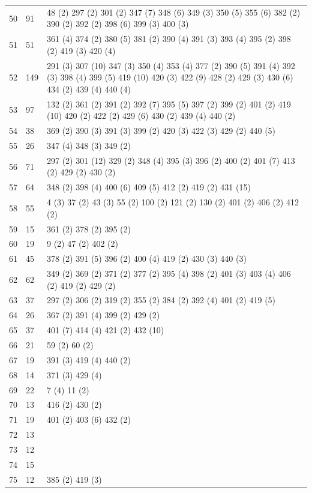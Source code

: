 \begin{landscape}
\begin{longtable}{|p{1.5cm}|p{1.25cm}|p{21cm}|}
50 & 91 & 48 (2) 297 (2) 301 (2) 347 (7) 348 (6) 349 (3) 350 (5) 355 (6) 382 (2) 390 (2) 392 (2) 398 (6) 399 (3) 400 (3) \\
51 & 51 & 361 (4) 374 (2) 380 (5) 381 (2) 390 (4) 391 (3) 393 (4) 395 (2) 398 (2) 419 (3) 420 (4) \\
52 & 149 & 291 (3) 307 (10) 347 (3) 350 (4) 353 (4) 377 (2) 390 (5) 391 (4) 392 (3) 398 (4) 399 (5) 419 (10) 420 (3) 422 (9) 428 (2) 429 (3) 430 (6) 434 (2) 439 (4) 440 (4) \\
53 & 97 & 132 (2) 361 (2) 391 (2) 392 (7) 395 (5) 397 (2) 399 (2) 401 (2) 419 (10) 420 (2) 422 (2) 429 (6) 430 (2) 439 (4) 440 (2) \\
54 & 38 & 369 (2) 390 (3) 391 (3) 399 (2) 420 (3) 422 (3) 429 (2) 440 (5) \\
55 & 26 & 347 (4) 348 (3) 349 (2) \\
56 & 71 & 297 (2) 301 (12) 329 (2) 348 (4) 395 (3) 396 (2) 400 (2) 401 (7) 413 (2) 429 (2) 430 (2) \\
57 & 64 & 348 (2) 398 (4) 400 (6) 409 (5) 412 (2) 419 (2) 431 (15) \\
58 & 55 & 4 (3) 37 (2) 43 (3) 55 (2) 100 (2) 121 (2) 130 (2) 401 (2) 406 (2) 412 (2) \\
59 & 15 & 361 (2) 378 (2) 395 (2) \\
60 & 19 & 9 (2) 47 (2) 402 (2) \\
61 & 45 & 378 (2) 391 (5) 396 (2) 400 (4) 419 (2) 430 (3) 440 (3) \\
62 & 62 & 349 (2) 369 (2) 371 (2) 377 (2) 395 (4) 398 (2) 401 (3) 403 (4) 406 (2) 419 (2) 429 (2) \\
63 & 37 & 297 (2) 306 (2) 319 (2) 355 (2) 384 (2) 392 (4) 401 (2) 419 (5) \\
64 & 26 & 367 (2) 391 (4) 399 (2) 429 (2) \\
65 & 37 & 401 (7) 414 (4) 421 (2) 432 (10) \\
66 & 21 & 59 (2) 60 (2) \\
67 & 19 & 391 (3) 419 (4) 440 (2) \\
68 & 14 & 371 (3) 429 (4) \\
69 & 22 & 7 (4) 11 (2) \\
70 & 13 & 416 (2) 430 (2) \\
71 & 19 & 401 (2) 403 (6) 432 (2) \\
72 & 13 & \\
73 & 12 & \\
74 & 15 & \\
75 & 12 & 385 (2) 419 (3) \\

\end{longtable}
\end{landscape}
